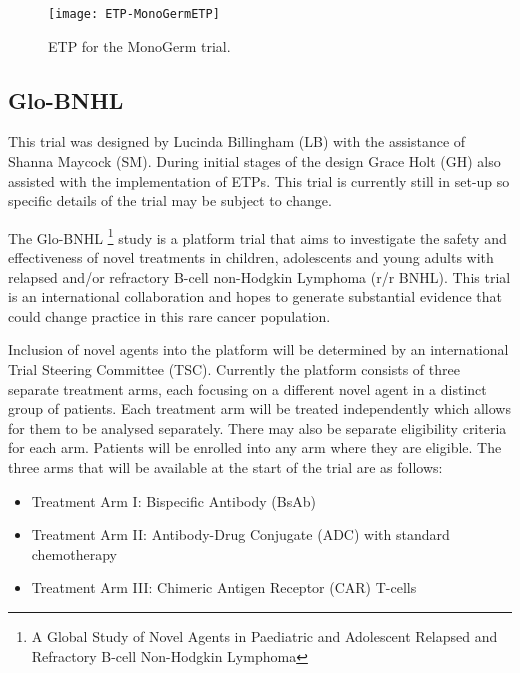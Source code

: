  
\begin{sidewaysfigure}[h!]
	\centering
	\caption{ETP for the MonoGerm trial.}
	\label{fig_etp:MonoGermETP}
	\texttt{[image: ETP-MonoGermETP]}
\end{sidewaysfigure} 

 \clearpage
 

\subsection{Glo-BNHL}

This trial was designed by Lucinda Billingham (LB) with the assistance of Shanna Maycock (SM). During initial stages of the design Grace Holt (GH) also assisted with the implementation of ETPs. This trial is currently still in set-up so specific details of the trial may be subject to change.   

The Glo-BNHL \footnote{A Global Study of Novel Agents in Paediatric and Adolescent Relapsed and Refractory B-cell Non-Hodgkin Lymphoma} study is a platform trial that aims to investigate the safety and effectiveness of novel treatments in children, adolescents and young adults with relapsed and/or refractory B-cell non-Hodgkin Lymphoma (r/r BNHL). This trial is an international collaboration and hopes to generate substantial evidence that could change practice in this rare cancer population. 

Inclusion of novel agents into the platform will be determined by an international Trial Steering Committee (TSC). Currently the platform consists of three separate treatment arms, each focusing on a different novel agent in a distinct group of patients. Each treatment arm will be treated independently which allows for them to be analysed separately. There may also be separate eligibility criteria for each arm. Patients will be enrolled into any arm where they are eligible. The three arms that will be available at the start of the trial are as follows: 

\begin{itemize}
	\item Treatment Arm \RN{1}: Bispecific Antibody (BsAb)
	\item Treatment Arm \RN{2}: Antibody-Drug Conjugate (ADC) with standard \\ chemotherapy
	\item Treatment Arm \RN{3}: Chimeric Antigen Receptor (CAR) T-cells
\end{itemize}

